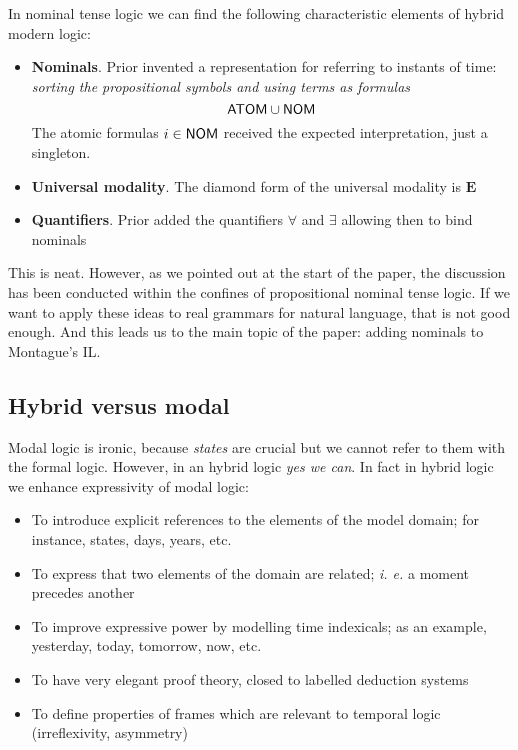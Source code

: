 In nominal tense logic we can find the following characteristic elements of
hybrid modern logic:

\begin{itemize}
\item \textbf{Nominals}. Prior invented a representation for referring to
instants of time: \emph{sorting the propositional symbols and using terms
as formulas} 
$$
\textsf{ATOM} \cup \textsf{NOM}
$$
The atomic formulas $i\in \textsf{NOM}$ received the expected
interpretation, just a singleton.

\item \textbf{Universal modality}. The diamond form of the universal
modality is $\mathbf{E}$

\item \textbf{Quantifiers}. Prior added the quantifiers $\forall$ and 
$\exists$ allowing then to bind nominals
\end{itemize}

This is neat. However, as we pointed out at the start of the paper, the
discussion has been conducted within the confines of propositional nominal
tense logic. If we want to apply these ideas to real grammars for natural
language, that is not good enough. And this leads us to the main topic of
the paper: adding nominals to Montague's IL.

\subsection{Hybrid versus modal}

Modal logic is ironic, because \emph{states}
are crucial but we cannot refer to them with the formal logic. However, in
an hybrid logic \emph{yes we can\textexclamdown }. In fact in hybrid logic
we enhance expressivity of modal logic:

\begin{itemize}
\item To introduce explicit references to the elements of the model domain;
for instance, states, days, years, etc.

\item To express that two elements of the domain are related; \emph{i. e.}
a moment precedes another

\item To improve expressive power by modelling time indexicals; as an
example, yesterday, today, tomorrow, now, etc.

\item To have very elegant proof theory, closed to labelled deduction systems

\item To define properties of frames which are relevant to temporal logic
(irreflexivity, asymmetry)
\end{itemize}

